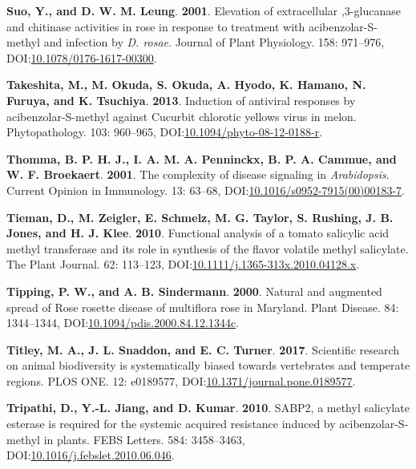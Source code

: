 \documentclass[12pt,final,CPage]{ufthesis}
\newlength{\cslhangindent}
\newenvironment{CSLReferences}[2] %
{%
	\setlength{\parindent}{0pt}
	\ifodd #1 \everypar{\setlength{\hangindent}{\cslhangindent}}\ignorespaces\fi
	\ifnum #2 > 0
	\setlength{\parskip}{#2\baselineskip}
	\fi
}%
{}
\begin{document}
{\begin{CSLReferences}{1}{0}
  \leavevmode{}%
  \textbf{Suo, Y., and D. W. M. Leung}. \textbf{2001}. Elevation of extracellular ,3-glucanase and chitinase activities in rose in response to treatment with acibenzolar-{S}-methyl and infection by {\emph{D. rosae}}. Journal of Plant Physiology. 158: 971--976, DOI:\href{https://doi.org/10.1078/0176-1617-00300}{10.1078/0176-1617-00300}.

  \leavevmode{}%
  \textbf{Takeshita, M., M. Okuda, S. Okuda, A. Hyodo, K. Hamano, N. Furuya, and K. Tsuchiya}. \textbf{2013}. Induction of antiviral responses by acibenzolar-{S}-methyl against {Cucurbit chlorotic yellows virus} in melon. Phytopathology{\textregistered}. 103: 960--965, DOI:\href{https://doi.org/10.1094/phyto-08-12-0188-r}{10.1094/phyto-08-12-0188-r}.

  \leavevmode{}%
  \textbf{Thomma, B. P. H. J., I. A. M. A. Penninckx, B. P. A. Cammue, and W. F. Broekaert}. \textbf{2001}. The complexity of disease signaling in {\emph{Arabidopsis}}. Current Opinion in Immunology. 13: 63--68, DOI:\href{https://doi.org/10.1016/s0952-7915(00)00183-7}{10.1016/s0952-7915(00)00183-7}.

  \leavevmode{}%
  \textbf{Tieman, D., M. Zeigler, E. Schmelz, M. G. Taylor, S. Rushing, J. B. Jones, and H. J. Klee}. \textbf{2010}. Functional analysis of a tomato salicylic acid methyl transferase and its role in synthesis of the flavor volatile methyl salicylate. The Plant Journal. 62: 113--123, DOI:\href{https://doi.org/10.1111/j.1365-313x.2010.04128.x}{10.1111/j.1365-313x.2010.04128.x}.

  \leavevmode{}%
  \textbf{Tipping, P. W., and A. B. Sindermann}. \textbf{2000}. Natural and augmented spread of {Rose rosette disease} of multiflora rose in {Maryland}. Plant Disease. 84: 1344--1344, DOI:\href{https://doi.org/10.1094/pdis.2000.84.12.1344c}{10.1094/pdis.2000.84.12.1344c}.

  \leavevmode{}%
  \textbf{Titley, M. A., J. L. Snaddon, and E. C. Turner}. \textbf{2017}. Scientific research on animal biodiversity is systematically biased towards vertebrates and temperate regions. {PLOS} {ONE}. 12: e0189577, DOI:\href{https://doi.org/10.1371/journal.pone.0189577}{10.1371/journal.pone.0189577}.

  \leavevmode{}%
  \textbf{Tripathi, D., Y.-L. Jiang, and D. Kumar}. \textbf{2010}. {SABP}2, a methyl salicylate esterase is required for the systemic acquired resistance induced by acibenzolar-{S}-methyl in plants. {FEBS} Letters. 584: 3458--3463, DOI:\href{https://doi.org/10.1016/j.febslet.2010.06.046}{10.1016/j.febslet.2010.06.046}.


\end{CSLReferences}}
\end{document}
